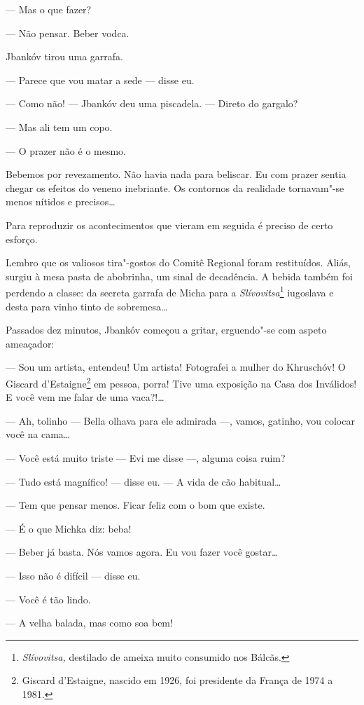 --- Mas o que fazer?

--- Não pensar. Beber vodca.

Jbankóv tirou uma garrafa.

--- Parece que vou matar a sede --- disse eu.

--- Como não! --- Jbankóv deu uma piscadela. ---
Direto do gargalo?

--- Mas ali tem um copo.

--- O prazer não é o mesmo.

Bebemos por revezamento. Não havia nada para beliscar. Eu com prazer
sentia chegar os efeitos do veneno inebriante. Os contornos da realidade
tornavam"-se menos nítidos e precisos\ldots{}

Para reproduzir os acontecimentos que vieram em seguida é preciso de
certo esforço.

Lembro que os valiosos tira"-gostos do Comitê Regional foram restituídos.
Aliás, surgiu à mesa pasta de abobrinha, um sinal de decadência. A
bebida também foi perdendo a classe: da secreta garrafa de Micha para a
\emph{Slívovitsa}\footnote{\emph{Slívovitsa,} destilado de ameixa muito
  consumido nos Bálcãs.} iugoslava e desta para vinho tinto de
sobremesa\ldots{}

Passados dez minutos, Jbankóv começou a gritar, erguendo"-se com aspeto
ameaçador:

--- Sou um artista, entendeu! Um artista! Fotografei a mulher do
Khruschóv! O Giscard d'Estaigne\footnote{Giscard d'Estaigne, nascido em
  1926, foi presidente da França de 1974 a 1981.} em pessoa, porra! Tive
uma exposição na Casa dos Inválidos! E você vem me falar de uma
vaca?!\ldots{}

--- Ah, tolinho --- Bella olhava para ele admirada
---, vamos, gatinho, vou colocar você na cama\ldots{}

--- Você está muito triste --- Evi me disse ---,
alguma coisa ruim?

--- Tudo está magnífico! --- disse eu. --- A vida
de cão habitual\ldots{}

--- Tem que pensar menos. Ficar feliz com o bom que existe.

--- É o que Michka diz: beba!

--- Beber já basta. Nós vamos agora. Eu vou fazer você gostar\ldots{}

--- Isso não é difícil --- disse eu.

--- Você é tão lindo.

--- A velha balada, mas como soa bem!

